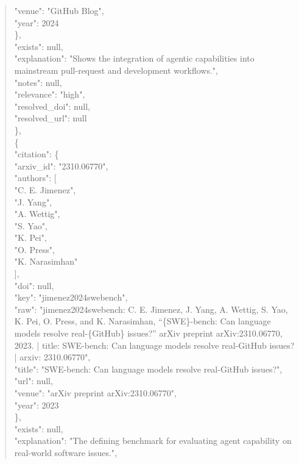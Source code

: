 \documentclass[11pt]{article}
\begin{document}
\begin{quote}
        "venue": "GitHub Blog",\\
        "year": 2024\\
      \},\\
      "exists": null,\\
      "explanation": "Shows the integration of agentic capabilities into mainstream pull-request and development workflows.",\\
      "notes": null,\\
      "relevance": "high",\\
      "resolved\_doi": null,\\
      "resolved\_url": null\\
    \},\\
    \{\\
      "citation": \{\\
        "arxiv\_id": "2310.06770",\\
        "authors": [\\
          "C. E. Jimenez",\\
          "J. Yang",\\
          "A. Wettig",\\
          "S. Yao",\\
          "K. Pei",\\
          "O. Press",\\
          "K. Narasimhan"\\
        ],\\
        "doi": null,\\
        "key": "jimenez2024swebench",\\
        "raw": "jimenez2024swebench: C. E. Jimenez, J. Yang, A. Wettig, S. Yao, K. Pei, O. Press, and K. Narasimhan, ``\{SWE\}-bench: Can language models resolve real-\{GitHub\} issues?'' arXiv preprint arXiv:2310.06770, 2023. | title: SWE-bench: Can language models resolve real-GitHub issues? | arxiv: 2310.06770",\\
        "title": "SWE-bench: Can language models resolve real-GitHub issues?",\\
        "url": null,\\
        "venue": "arXiv preprint arXiv:2310.06770",\\
        "year": 2023\\
      \},\\
      "exists": null,\\
      "explanation": "The defining benchmark for evaluating agent capability on real-world software issues.",\\

\end{quote}
\end{document}
